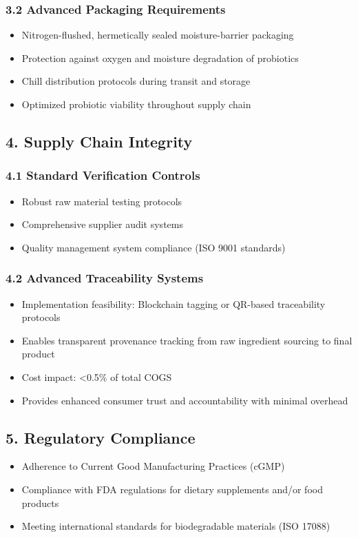 \documentclass[12pt]{article}
\begin{document}
\subsubsection*{3.2 Advanced Packaging Requirements}
\begin{itemize}
    \item Nitrogen-flushed, hermetically sealed moisture-barrier packaging
    \item Protection against oxygen and moisture degradation of probiotics
    \item Chill distribution protocols during transit and storage
    \item Optimized probiotic viability throughout supply chain
\end{itemize}

\subsection*{4. Supply Chain Integrity}

\subsubsection*{4.1 Standard Verification Controls}
\begin{itemize}
    \item Robust raw material testing protocols
    \item Comprehensive supplier audit systems
    \item Quality management system compliance (ISO 9001 standards)
\end{itemize}

\subsubsection*{4.2 Advanced Traceability Systems}
\begin{itemize}
    \item Implementation feasibility: Blockchain tagging or QR-based traceability protocols
    \item Enables transparent provenance tracking from raw ingredient sourcing to final product
    \item Cost impact: <0.5\% of total COGS
    \item Provides enhanced consumer trust and accountability with minimal overhead
\end{itemize}

\subsection*{5. Regulatory Compliance}
\begin{itemize}
    \item Adherence to Current Good Manufacturing Practices (cGMP)
    \item Compliance with FDA regulations for dietary supplements and/or food products
    \item Meeting international standards for biodegradable materials (ISO 17088)
\end{itemize}
\end{document}

